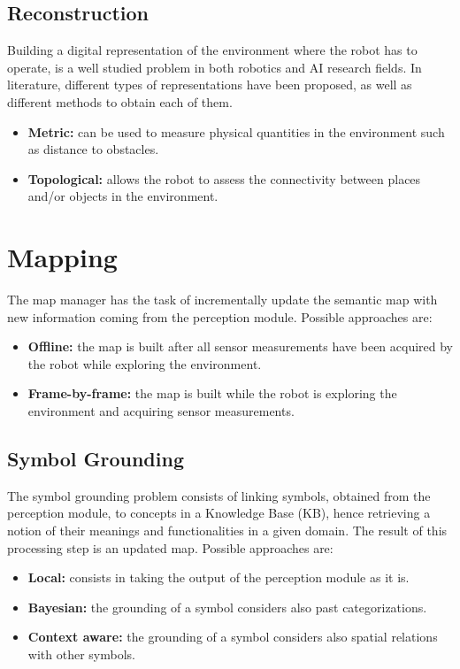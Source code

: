 \documentclass{article}
\begin{document}
	\subsection{Reconstruction}
	
	Building a digital representation of the environment where the robot has to operate, is a well studied problem in both robotics and AI research fields. In literature,  different types of representations have been proposed, as well as different methods to obtain each of them.
		
	\begin{itemize}
		\item {\bf Metric:} can be used to measure physical quantities in the environment such as distance to obstacles.
		\item {\bf Topological:} allows the robot to assess the connectivity between places and/or objects in the environment.
	\end{itemize}
		
	\section{Mapping}
	
	The map manager has the task of incrementally update the semantic map with new information coming from the perception module. Possible approaches are:
		
	\begin{itemize}
		\item {\bf Offline:} the map is built after all sensor measurements have been acquired by the robot while exploring the environment.
		\item {\bf Frame-by-frame:} the map is built while the robot is exploring the environment and acquiring sensor measurements.
	\end{itemize}
	
	\subsection{Symbol Grounding}
	
	The symbol grounding problem consists of linking symbols, obtained from the perception module, to concepts in a Knowledge Base (KB), hence retrieving a notion	of their meanings and functionalities in a given domain. The result of this processing step is an updated map. Possible approaches are:
	
	\begin{itemize}
		\item {\bf Local:} consists in taking the output of the perception module as it is.
		\item {\bf Bayesian:} the grounding of a symbol considers also past categorizations.
		\item {\bf Context aware:} the grounding of a symbol considers also spatial relations with other symbols.
	\end{itemize}
	
\end{document}
